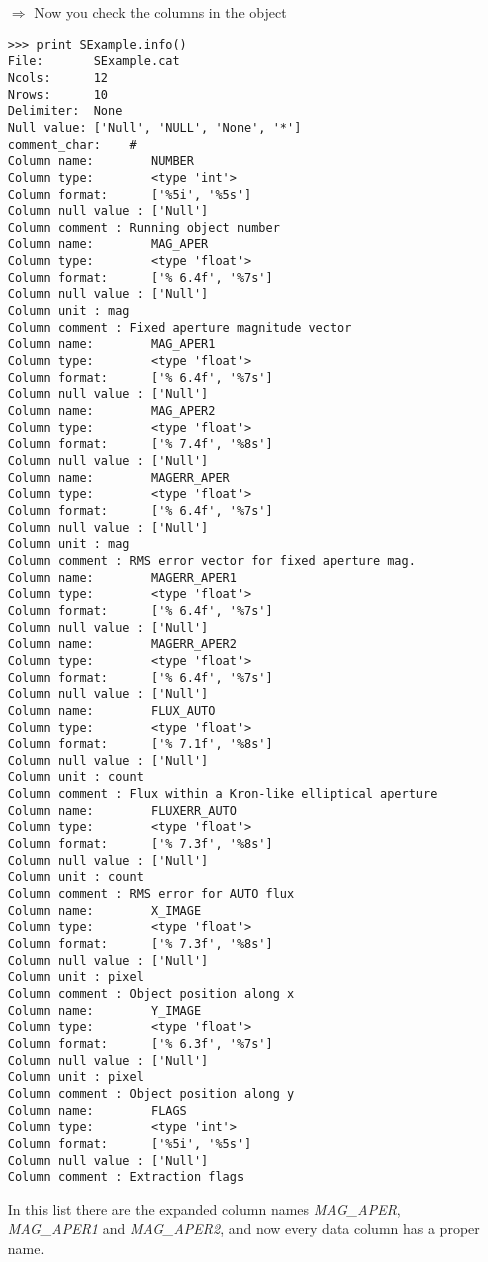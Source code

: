 \begin{itemize}
\item[$\Rightarrow$] Now you check the columns in the \ad object
\begin{small}
\begin{verbatim}
>>> print SExample.info()
File:       SExample.cat
Ncols:      12
Nrows:      10
Delimiter:  None
Null value: ['Null', 'NULL', 'None', '*']
comment_char:    #
Column name:        NUMBER
Column type:        <type 'int'>
Column format:      ['%5i', '%5s']
Column null value : ['Null']
Column comment : Running object number
Column name:        MAG_APER
Column type:        <type 'float'>
Column format:      ['% 6.4f', '%7s']
Column null value : ['Null']
Column unit : mag
Column comment : Fixed aperture magnitude vector
Column name:        MAG_APER1
Column type:        <type 'float'>
Column format:      ['% 6.4f', '%7s']
Column null value : ['Null']
Column name:        MAG_APER2
Column type:        <type 'float'>
Column format:      ['% 7.4f', '%8s']
Column null value : ['Null']
Column name:        MAGERR_APER
Column type:        <type 'float'>
Column format:      ['% 6.4f', '%7s']
Column null value : ['Null']
Column unit : mag
Column comment : RMS error vector for fixed aperture mag.
Column name:        MAGERR_APER1
Column type:        <type 'float'>
Column format:      ['% 6.4f', '%7s']
Column null value : ['Null']
Column name:        MAGERR_APER2
Column type:        <type 'float'>
Column format:      ['% 6.4f', '%7s']
Column null value : ['Null']
Column name:        FLUX_AUTO
Column type:        <type 'float'>
Column format:      ['% 7.1f', '%8s']
Column null value : ['Null']
Column unit : count
Column comment : Flux within a Kron-like elliptical aperture
Column name:        FLUXERR_AUTO
Column type:        <type 'float'>
Column format:      ['% 7.3f', '%8s']
Column null value : ['Null']
Column unit : count
Column comment : RMS error for AUTO flux
Column name:        X_IMAGE
Column type:        <type 'float'>
Column format:      ['% 7.3f', '%8s']
Column null value : ['Null']
Column unit : pixel
Column comment : Object position along x
Column name:        Y_IMAGE
Column type:        <type 'float'>
Column format:      ['% 6.3f', '%7s']
Column null value : ['Null']
Column unit : pixel
Column comment : Object position along y
Column name:        FLAGS
Column type:        <type 'int'>
Column format:      ['%5i', '%5s']
Column null value : ['Null']
Column comment : Extraction flags
\end{verbatim}
\end{small}
In this list there are the expanded column names {\sl MAG\_APER},
{\sl MAG\_APER1} and {\sl MAG\_APER2}, and now every data column has
a proper name.


\end{itemize}
